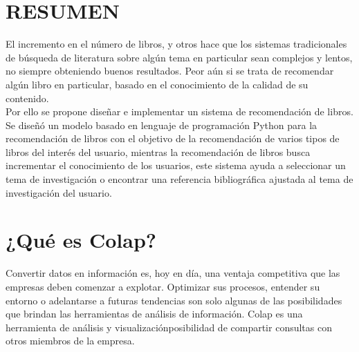 \section{RESUMEN} 

El incremento en el número de libros, y otros hace que los sistemas tradicionales de búsqueda de literatura sobre algún tema en particular sean complejos y lentos, no siempre obteniendo buenos resultados. Peor aún si se trata de recomendar algún libro en particular, basado en el conocimiento de la calidad de su contenido. 
\\
Por ello se propone diseñar e implementar un sistema de recomendación de libros. Se diseñó un modelo basado en lenguaje de programación Python para la recomendación de libros con el objetivo de la recomendación de varios tipos de libros del interés del usuario, mientras la recomendación de libros busca incrementar el conocimiento de los usuarios, este sistema ayuda a seleccionar un tema de investigación o encontrar una referencia bibliográfica ajustada al tema de investigación del usuario. 


\section{¿Qué es Colap?} 
Convertir datos en información es, hoy en día, una ventaja competitiva que las empresas deben comenzar a explotar. Optimizar sus procesos, entender su entorno o adelantarse a futuras tendencias son solo algunas de las posibilidades que brindan las herramientas de análisis de información.
Colap es una herramienta de análisis y visualizaciónposibilidad de compartir consultas con otros miembros de la empresa.

